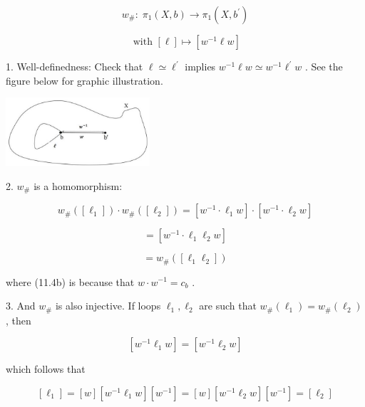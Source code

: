 \[
{w}_{\# } : \;{\pi }_{1}\left( {X,b}\right)  \rightarrow  {\pi }_{1}\left( {X,{b}^{\prime }}\right)
\]

\[
\text{ with }\left\lbrack  \ell \right\rbrack   \mapsto  \left\lbrack  {{w}^{-1}\ell w}\right\rbrack
\]

1. Well-definedness: Check that \(\ell  \simeq  {\ell }^{\prime }\) implies \({w}^{-1}\ell w \simeq  {w}^{-1}{\ell }^{\prime }w\) . See the figure below for graphic illustration.

\begin{center}
\includegraphics[max width=0.4\textwidth]{images/bo_d2bcsrref24c73avs720_119_683_1166_568_270_0.jpg}
\end{center}
\hspace*{3em} 

2. \({w}_{\# }\) is a homomorphism:

\[
{w}_{\# }\left( \left\lbrack  {\ell }_{1}\right\rbrack  \right)  \cdot  {w}_{\# }\left( \left\lbrack  {\ell }_{2}\right\rbrack  \right)  = \left\lbrack  {{w}^{-1} \cdot  {\ell }_{1}w}\right\rbrack   \cdot  \left\lbrack  {{w}^{-1} \cdot  {\ell }_{2}w}\right\rbrack   \tag{11.4a}
\]

\[
= \left\lbrack  {{w}^{-1} \cdot  {\ell }_{1}{\ell }_{2}w}\right\rbrack   \tag{11.4b}
\]

\[
= {w}_{\# }\left( \left\lbrack  {{\ell }_{1}{\ell }_{2}}\right\rbrack  \right)  \tag{11.4c}
\]

where (11.4b) is because that \(w \cdot  {w}^{-1} = {c}_{b}\) .

3. And \({w}_{\# }\) is also injective. If loops \({\ell }_{1},{\ell }_{2}\) are such that \({w}_{\# }\left( {\ell }_{1}\right)  = {w}_{\# }\left( {\ell }_{2}\right)\) , then

\[
\left\lbrack  {{w}^{-1}{\ell }_{1}w}\right\rbrack   = \left\lbrack  {{w}^{-1}{\ell }_{2}w}\right\rbrack
\]

which follows that

\[
\left\lbrack  {\ell }_{1}\right\rbrack   = \left\lbrack  w\right\rbrack  \left\lbrack  {{w}^{-1}{\ell }_{1}w}\right\rbrack  \left\lbrack  {w}^{-1}\right\rbrack   = \left\lbrack  w\right\rbrack  \left\lbrack  {{w}^{-1}{\ell }_{2}w}\right\rbrack  \left\lbrack  {w}^{-1}\right\rbrack   = \left\lbrack  {\ell }_{2}\right\rbrack   \tag{11.5}
\]

